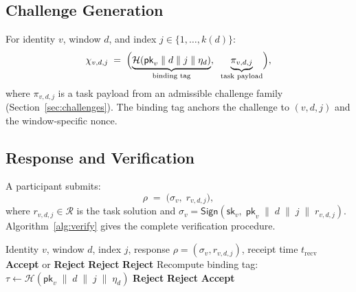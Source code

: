 \documentclass[11pt]{article}
\newcommand{\HCO}{HCO\xspace}
\theoremstyle{remark}
\theoremstyle{plain}
\begin{document}
	\subsection{Challenge Generation}
	
	For identity $v$, window $d$, and index $j \in \{1,\ldots,k(d)\}$:
	\begin{equation}
		\chi_{v,d,j}
		\;=\;
		\Bigl(
		\underbrace{\mathcal{H}(\mathsf{pk}_v \;\|\; d \;\|\; j \;\|\; \eta_d)}_{\text{binding tag}},
		\;\;
		\underbrace{\pi_{v,d,j}}_{\text{task payload}}
		\Bigr),
		\label{eq:challenge-gen}
	\end{equation}
	where $\pi_{v,d,j}$ is a task payload from an admissible challenge
	family (Section~\ref{sec:challenges}). The binding tag anchors the
	challenge to $(v,d,j)$ and the window-specific nonce.
	
	\subsection{Response and Verification}
	
	A participant submits:
	\[
	\rho \;=\; \bigl(\sigma_v,\; r_{v,d,j}\bigr),
	\]
	where $r_{v,d,j} \in \mathcal{R}$ is the task solution and
	$\sigma_v = \mathsf{Sign}(\mathsf{sk}_v,\;
	\mathsf{pk}_v \;\|\; d \;\|\; j \;\|\; r_{v,d,j})$.
	Algorithm~\ref{alg:verify} gives the complete verification procedure.
	
	\begin{algorithm}[t]
		\caption{$\HCO.\mathsf{Verify}(v,\, d,\, j,\, \rho,\, t_{\mathrm{recv}})$}
		\label{alg:verify}
		\begin{algorithmic}[1]
			\REQUIRE Identity $v$, window $d$, index $j$,
			response $\rho = (\sigma_v, r_{v,d,j})$,
			receipt time $t_{\mathrm{recv}}$
			\ENSURE \textbf{Accept} or \textbf{Reject}
			\RETURN \textbf{Reject} \hfill{}
			\ENDIF
			\RETURN \textbf{Reject} \hfill{}
			\ENDIF
			\STATE Recompute binding tag:
			$\tau \leftarrow \mathcal{H}(\mathsf{pk}_v \;\|\; d \;\|\; j \;\|\; \eta_d)$
			\RETURN \textbf{Reject} \hfill{}
			\ENDIF
			\RETURN \textbf{Reject} \hfill{}
			\ENDIF
			\RETURN \textbf{Accept}
		\end{algorithmic}
	\end{algorithm}
	
\end{document}
